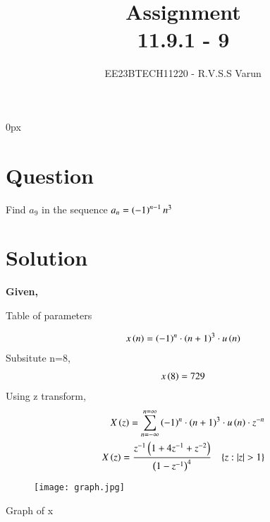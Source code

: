 \documentclass[beamer]{IEEEtran}
\theoremstyle{remark}
\begin{document}
\parindent 0px


\title{Assignment\\[1ex]11.9.1 - 9}
\author{EE23BTECH11220 - R.V.S.S Varun$^{}$%
}
\maketitle
\newpage
\bigskip

\renewcommand{\thefigure}{\theenumi}
\renewcommand{\thetable}{\theenumi}
\section*{Question}
Find $a_{9}$ in the sequence $a_{n}=\left(-1\right)^{n-1}n^{3}$ 
\section*{Solution}
\textbf{Given,} 
\begin{table}[h]
    \centering
   
    \vspace{10pt}
    \caption{Table of parameters}
    \label{tab:my_label}
\end{table}

\begin{align}
x\left(n\right)=\left(-1\right)^{n}\cdot \left(n+1\right)^{3}\cdot u\left(n\right)
\end{align}
Subsitute n=8,
\begin{align}
x\left(8\right)=729
\end{align}
Using  z transform,
\begin{align}
X\brak{z}=\sum_{n=-\infty}^{n=\infty}\brak{-1}^{n}\cdot (n+1)^{3}\cdot u\brak{n}\cdot z^{-n}\\
X\brak{z}=\frac{z^{-1}\brak{1+4z^{-1}+z^{-2}}}{\brak{1-z^{-1}}^{4}}\hspace{10pt}
\{z:|z|>1\}
\end{align} 

\begin{figure}[h]
    \centering
    \texttt{[image: graph.jpg]} 
    \label{fig:enter-label}
\end{figure}
\begin{center}
Graph of x
   \end{center}
\end{document}
